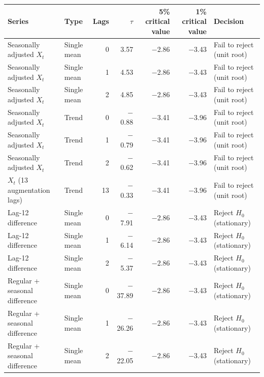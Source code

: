 \begin{tabular}{llrrrrl}
\toprule
Series & Type & Lags & $\tau$ & 5\% critical value & 1\% critical value & Decision\\
\midrule
Seasonally adjusted $X_t$ & Single mean & 0 & 3.57 & $-$2.86 & $-$3.43 & Fail to reject (unit root)\\
Seasonally adjusted $X_t$ & Single mean & 1 & 4.53 & $-$2.86 & $-$3.43 & Fail to reject (unit root)\\
Seasonally adjusted $X_t$ & Single mean & 2 & 4.85 & $-$2.86 & $-$3.43 & Fail to reject (unit root)\\
Seasonally adjusted $X_t$ & Trend & 0 & $-$0.88 & $-$3.41 & $-$3.96 & Fail to reject (unit root)\\
Seasonally adjusted $X_t$ & Trend & 1 & $-$0.79 & $-$3.41 & $-$3.96 & Fail to reject (unit root)\\
Seasonally adjusted $X_t$ & Trend & 2 & $-$0.62 & $-$3.41 & $-$3.96 & Fail to reject (unit root)\\
$X_t$ (13 augmentation lags) & Trend & 13 & $-$0.33 & $-$3.41 & $-$3.96 & Fail to reject (unit root)\\
Lag-12 difference & Single mean & 0 & $-$7.91 & $-$2.86 & $-$3.43 & Reject $H_0$ (stationary)\\
Lag-12 difference & Single mean & 1 & $-$6.14 & $-$2.86 & $-$3.43 & Reject $H_0$ (stationary)\\
Lag-12 difference & Single mean & 2 & $-$5.37 & $-$2.86 & $-$3.43 & Reject $H_0$ (stationary)\\
Regular + seasonal difference & Single mean & 0 & $-$37.89 & $-$2.86 & $-$3.43 & Reject $H_0$ (stationary)\\
Regular + seasonal difference & Single mean & 1 & $-$26.26 & $-$2.86 & $-$3.43 & Reject $H_0$ (stationary)\\
Regular + seasonal difference & Single mean & 2 & $-$22.05 & $-$2.86 & $-$3.43 & Reject $H_0$ (stationary)\\
\bottomrule
\end{tabular}
